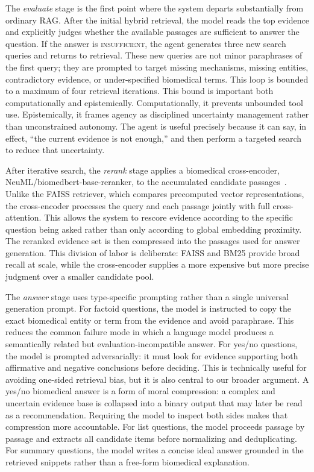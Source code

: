 \documentclass[sigconf,nonacm]{acmart}
\begin{document}
The \emph{evaluate} stage is the first point where the system departs substantially from ordinary RAG. After the initial hybrid retrieval, the model reads the top evidence and explicitly judges whether the available passages are sufficient to answer the question. If the answer is \textsc{insufficient}, the agent generates three new search queries and returns to retrieval. These new queries are not minor paraphrases of the first query; they are prompted to target missing mechanisms, missing entities, contradictory evidence, or under-specified biomedical terms. This loop is bounded to a maximum of four retrieval iterations. This bound is important both computationally and epistemically. Computationally, it prevents unbounded tool use. Epistemically, it frames agency as disciplined uncertainty management rather than unconstrained autonomy. The agent is useful precisely because it can say, in effect, ``the current evidence is not enough,'' and then perform a targeted search to reduce that uncertainty.

After iterative search, the \emph{rerank} stage applies a biomedical cross-encoder, NeuML/biomedbert-base-reranker, to the accumulated candidate passages~\cite{neuml_reranker}. Unlike the FAISS retriever, which compares precomputed vector representations, the cross-encoder processes the query and each passage jointly with full cross-attention. This allows the system to rescore evidence according to the specific question being asked rather than only according to global embedding proximity. The reranked evidence set is then compressed into the passages used for answer generation. This division of labor is deliberate: FAISS and BM25 provide broad recall at scale, while the cross-encoder supplies a more expensive but more precise judgment over a smaller candidate pool.

The \emph{answer} stage uses type-specific prompting rather than a single universal generation prompt. For factoid questions, the model is instructed to copy the exact biomedical entity or term from the evidence and avoid paraphrase. This reduces the common failure mode in which a language model produces a semantically related but evaluation-incompatible answer. For yes/no questions, the model is prompted adversarially: it must look for evidence supporting both affirmative and negative conclusions before deciding. This is technically useful for avoiding one-sided retrieval bias, but it is also central to our broader argument. A yes/no biomedical answer is a form of moral compression: a complex and uncertain evidence base is collapsed into a binary output that may later be read as a recommendation. Requiring the model to inspect both sides makes that compression more accountable. For list questions, the model proceeds passage by passage and extracts all candidate items before normalizing and deduplicating. For summary questions, the model writes a concise ideal answer grounded in the retrieved snippets rather than a free-form biomedical explanation.
\end{document}
